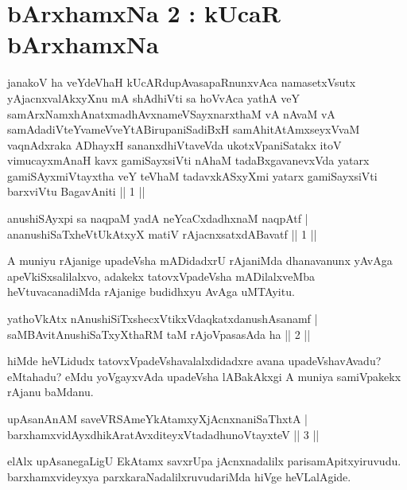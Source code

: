 \chapter{bArxhamxNa 2 : kUcaR bArxhamxNa}
\begin{kandikeshl}
janakoV ha veYdeVhaH kUcARdupAvasapaRnunxvAca namasetxV\s sutx \-yAjacnxvalAkxyXnu mA shAdhiVti sa hoVvAca yathA veY samArxNamxhAnatxmadhAvxnameVSayxnarxthaM vA nAvaM vA samAdadiVteYvameVveYtABirupaniSadiBxH samAhitAtAmxseyxVvaM vaqnAdxraka ADhayxH sananxdhiVtaveVda ukotxVpaniSatakx itoV vimucayxmAnaH kavx gamiSayxsiVti nAhaM tadaBxgavanevxVda yatarx gamiSAyxmiVtayxtha veY teV\s haM tadavxkASxyXmi yatarx gamiSayxsiVti barxviVtu BagavAniti || 1 ||
\end{kandikeshl}	
	
\begin{shl}
anushiSAyxpi sa naqpaM yadA neYcaCxdadhxnaM naqpAtf |\\
ananushiSaTxheVtUkAtxyX matiV rAjacnxsatxdA\s Bavatf \hfill || 1 || 
\end{shl}

\begin{artha}
A muniyu rAjanige upadeVsha mADidadxrU rAjaniMda dhanavanunx yAvAga apeVkiSxsalilalxvo, adakekx tatovxVpadeVsha mADilalxveMba heVtuvacanadiMda rAjanige budidhxyu AvAga uMTAyitu.
\end{artha}

\begin{shl}
yathoVkAtx nAnushiSiTxshecxVtikxVdaqkatxdanushAsanamf |\\
saMBAvitAnushiSaTxyXthaRM taM rAjoVpasasAda ha \hfill || 2 || 
\end{shl}

\begin{artha}
hiMde heVLidudx tatovxVpadeVshavalalxdidadxre avana upadeVshavAvadu? eMtahadu? eMdu yoVgayxvAda upadeVsha lABakAkxgi A muniya samiVpakekx rAjanu baMdanu.
\end{artha}

\begin{shl}
upAsanAnAM saveVRSAmeYkAtamxyXjAcnxnaniSaThxtA |\\
barxhamxvidAyxdhikAratAvxditeyxVtadadhunoVtayxteV \hfill || 3 || 
\end{shl}

\begin{artha}
elAlx upAsanegaLigU EkAtamx savxrUpa jAcnxnadalilx parisamApitxyiruvudu. barxhamxvideyxya parxkaraNadalilxruvudariMda hiVge heVLalAgide.
\end{artha}

